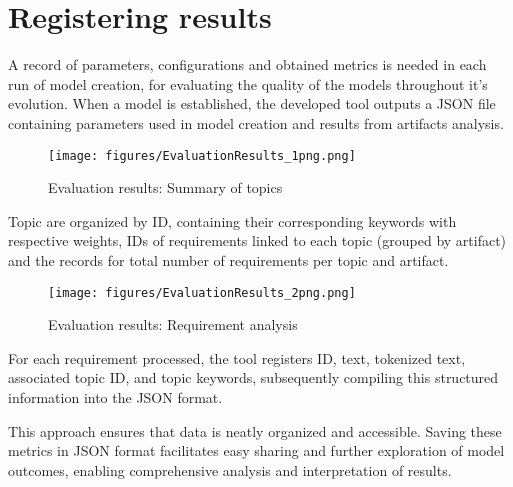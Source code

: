 

\section{Registering results}



A record of parameters, configurations and obtained metrics is needed in each run of model creation, for evaluating the quality of the models throughout it's evolution. When a  model is established, the developed tool outputs a JSON file containing parameters used in model creation and results from artifacts analysis.

\begin{figure}[h]
    \centering
    \texttt{[image: figures/EvaluationResults\_1png.png]}
    \caption{Evaluation results: Summary of topics}
    \label{fig:EvaluationResults_1png}
\end{figure}

Topic are organized by ID, containing their corresponding keywords with respective weights, IDs of requirements linked to each topic (grouped by artifact) and the records for total number of requirements per topic and artifact. 

\begin{figure}[h]
    \centering
    \texttt{[image: figures/EvaluationResults\_2png.png]}
    \caption{Evaluation results: Requirement analysis}
    \label{fig:EvaluationResults_2png}
\end{figure}

For each requirement processed, the tool registers ID, text, tokenized text, associated topic ID, and topic keywords, subsequently compiling this structured information into the JSON format. 

This approach ensures that data is neatly organized and accessible. Saving these metrics in JSON format facilitates easy sharing and further exploration of model outcomes, enabling comprehensive analysis and interpretation of results.


